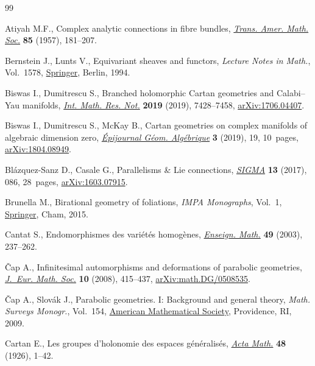 \documentclass[pdftex]{sigma}
\numberwithin{equation}{section}
\begin{document}
\begin{thebibliography}{99}
\footnotesize\itemsep=0pt

Atiyah M.F., Complex analytic connections in fibre bundles, \href{https://doi.org/10.2307/1992969}{\textit{Trans.
 Amer. Math. Soc.}} \textbf{85} (1957), 181--207.

Bernstein J., Lunts V., Equivariant sheaves and functors, \textit{Lecture Notes
 in Math.}, Vol.~1578, \href{https://doi.org/10.1007/BFb0073549}{Springer}, Berlin, 1994.

Biswas I., Dumitrescu S., Branched holomorphic {C}artan geometries and
 {C}alabi--{Y}au manifolds, \href{https://doi.org/10.1093/imrn/rny003}{\textit{Int. Math. Res. Not.}} \textbf{2019}
 (2019), 7428--7458, \href{https://arxiv.org/abs/1706.04407}{arXiv:1706.04407}.

Biswas I., Dumitrescu S., McKay B., Cartan geometries on complex manifolds of
 algebraic dimension zero, \href{https://doi.org/10.46298/epiga.2019.volume3.4460}{\textit{\'Epijournal G\'eom. Alg\'ebrique}}
 \textbf{3} (2019), 19, 10~pages, \href{https://arxiv.org/abs/1804.08949}{arXiv:1804.08949}.

Bl\'azquez-Sanz D., Casale G., Parallelisms \& {L}ie connections,
  \href{https://doi.org/10.3842/SIGMA.2017.086}{\textit{SIGMA}} \textbf{13} (2017), 086, 28~pages, \href{https://arxiv.org/abs/1603.07915}{arXiv:1603.07915}.

Brunella M., Birational geometry of foliations, \textit{IMPA Monographs},
 Vol.~1, \href{https://doi.org/10.1007/978-3-319-14310-1}{Springer}, Cham, 2015.

Cantat S., Endomorphismes des vari\'et\'es homog\`enes, \href{https://doi.org/10.1007/978-3-319-14310-1}{\textit{Enseign. Math.}}
 \textbf{49} (2003), 237--262.

\v{C}ap A., Infinitesimal automorphisms and deformations of parabolic
 geometries, \href{https://doi.org/10.4171/JEMS/116}{\textit{J.~Eur. Math. Soc.}} \textbf{10} (2008), 415--437,
 \href{https://arxiv.org/abs/math.DG/0508535}{arXiv:math.DG/0508535}.

\v{C}ap A., Slov\'ak J., Parabolic geometries. {I}: Background and general
 theory, \textit{Math. Surveys Monogr.}, Vol.~154, \href{https://doi.org/10.1090/surv/154}{American Mathematical Society}, Providence, RI, 2009.

Cartan E., Les groupes d'holonomie des espaces g\'en\'eralis\'es,  \href{https://doi.org/10.1007/BF02629755}{\textit{Acta
 Math.}} \textbf{48} (1926), 1--42.


\end{thebibliography}
\end{document}
